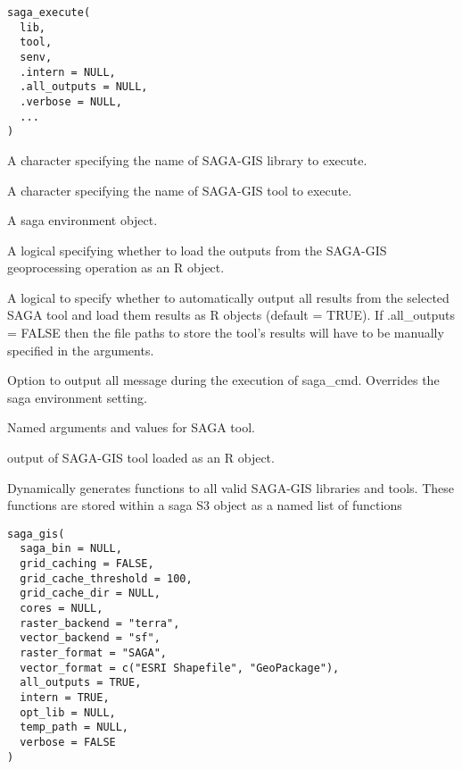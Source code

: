 \documentclass[a4paper]{book}
\begin{document}
%
\begin{Usage}
\begin{verbatim}
saga_execute(
  lib,
  tool,
  senv,
  .intern = NULL,
  .all_outputs = NULL,
  .verbose = NULL,
  ...
)
\end{verbatim}
\end{Usage}
%
\begin{Arguments}
\begin{ldescription}
\item[\code{lib}] A character specifying the name of SAGA-GIS library to execute.

\item[\code{tool}] A character specifying the name of SAGA-GIS tool to execute.

\item[\code{senv}] A saga environment object.

\item[\code{.intern}] A logical specifying whether to load the outputs from the
SAGA-GIS geoprocessing operation as an R object.

\item[\code{.all\_outputs}] A logical to specify whether to automatically output all
results from the selected SAGA tool and load them results as R objects
(default = TRUE). If .all\_outputs = FALSE then the file paths to store the
tool's results will have to be manually specified in the arguments.

\item[\code{.verbose}] Option to output all message during the execution of
saga\_cmd. Overrides the saga environment setting.

\item[\code{...}] Named arguments and values for SAGA tool.
\end{ldescription}
\end{Arguments}
%
\begin{Value}
output of SAGA-GIS tool loaded as an R object.
\end{Value}
%
\begin{Description}
Dynamically generates functions to all valid SAGA-GIS libraries and tools.
These functions are stored within a saga S3 object as a named list of
functions
\end{Description}
%
\begin{Usage}
\begin{verbatim}
saga_gis(
  saga_bin = NULL,
  grid_caching = FALSE,
  grid_cache_threshold = 100,
  grid_cache_dir = NULL,
  cores = NULL,
  raster_backend = "terra",
  vector_backend = "sf",
  raster_format = "SAGA",
  vector_format = c("ESRI Shapefile", "GeoPackage"),
  all_outputs = TRUE,
  intern = TRUE,
  opt_lib = NULL,
  temp_path = NULL,
  verbose = FALSE
)
\end{verbatim}
\end{Usage}
\end{document}
